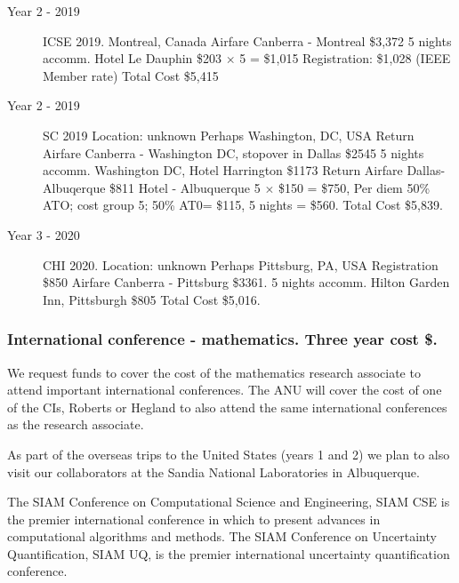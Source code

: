 \documentclass[a4paper,fontsize=12pt]{scrartcl}
\begin{document}
\begin{description}


\item[Year 2 - 2019] ICSE 2019.
Montreal, Canada
Airfare Canberra - Montreal \$3,372
5 nights accomm. Hotel Le Dauphin \$203 $\times$ 5 = \$1,015
Registration: \$1,028 (IEEE Member rate)
Total Cost \$5,415

\item[Year 2 - 2019] SC 2019
Location: unknown
Perhaps Washington, DC, USA
Return Airfare Canberra - Washington DC, stopover in Dallas  \$2545
5 nights accomm. Washington DC, Hotel Harrington \$1173
Return Airfare Dallas-Albuqerque \$811
Hotel - Albuquerque 5 $\times$  \$150 = \$750,
Per diem 50\% ATO; cost group 5; 50\% AT0= \$115, 5 nights = \$560. Total Cost \$5,839.

\item[Year 3 - 2020] CHI 2020.
Location: unknown 
Perhaps Pittsburg, PA, USA
Registration \$850 
Airfare Canberra - Pittsburg \$3361. 
5 nights accomm. Hilton Garden Inn, Pittsburgh \$805 
Total Cost \$5,016.



\end{description}


\subsubsection*{International conference - mathematics. Three year cost \$.}


We request funds to cover the cost of the mathematics research associate to attend important international conferences.  The ANU will cover the cost of one of the CIs, Roberts or Hegland to also attend the same international conferences as the research associate. 

As part of the overseas trips to the United States (years 1 and 2) we plan to also visit our collaborators at the Sandia National Laboratories in Albuquerque. 

The SIAM Conference on Computational Science and Engineering, SIAM CSE is the premier international conference in which to present advances in computational algorithms and methods. The SIAM Conference on Uncertainty Quantification, SIAM UQ, is the premier international uncertainty quantification conference.
\end{document}
